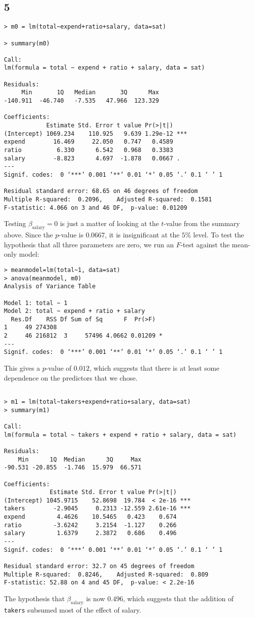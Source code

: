 \documentclass{article}
\begin{document}
\subsection*{5}
\begin{verbatim}
> m0 = lm(total~expend+ratio+salary, data=sat)

> summary(m0)

Call:
lm(formula = total ~ expend + ratio + salary, data = sat)

Residuals:
     Min       1Q   Median       3Q      Max 
-140.911  -46.740   -7.535   47.966  123.329 

Coefficients:
            Estimate Std. Error t value Pr(>|t|)    
(Intercept) 1069.234    110.925   9.639 1.29e-12 ***
expend        16.469     22.050   0.747   0.4589    
ratio          6.330      6.542   0.968   0.3383    
salary        -8.823      4.697  -1.878   0.0667 .  
---
Signif. codes:  0 ‘***’ 0.001 ‘**’ 0.01 ‘*’ 0.05 ‘.’ 0.1 ‘ ’ 1

Residual standard error: 68.65 on 46 degrees of freedom
Multiple R-squared:  0.2096,	Adjusted R-squared:  0.1581 
F-statistic: 4.066 on 3 and 46 DF,  p-value: 0.01209
\end{verbatim}

Testing $\beta_\text{salary}=0$ is just a matter of looking at the $t$-value from the summary above. Since the $p$-value is $0.0667$, it is insignificant at the $5\%$ level. To test the hypothesis that all three parameters are zero, we run an $F$-test against the mean-only model:
\begin{verbatim}
> meanmodel=lm(total~1, data=sat)
> anova(meanmodel, m0)
Analysis of Variance Table

Model 1: total ~ 1
Model 2: total ~ expend + ratio + salary
  Res.Df    RSS Df Sum of Sq      F  Pr(>F)  
1     49 274308                              
2     46 216812  3     57496 4.0662 0.01209 *
---
Signif. codes:  0 ‘***’ 0.001 ‘**’ 0.01 ‘*’ 0.05 ‘.’ 0.1 ‘ ’ 1
\end{verbatim}
This gives a $p$-value of $0.012$, which suggests that there is at least some dependence on the predictors that we chose. 
\begin{verbatim}

> m1 = lm(total~takers+expend+ratio+salary, data=sat)
> summary(m1)

Call:
lm(formula = total ~ takers + expend + ratio + salary, data = sat)

Residuals:
    Min      1Q  Median      3Q     Max 
-90.531 -20.855  -1.746  15.979  66.571 

Coefficients:
             Estimate Std. Error t value Pr(>|t|)    
(Intercept) 1045.9715    52.8698  19.784  < 2e-16 ***
takers        -2.9045     0.2313 -12.559 2.61e-16 ***
expend         4.4626    10.5465   0.423    0.674    
ratio         -3.6242     3.2154  -1.127    0.266    
salary         1.6379     2.3872   0.686    0.496    
---
Signif. codes:  0 ‘***’ 0.001 ‘**’ 0.01 ‘*’ 0.05 ‘.’ 0.1 ‘ ’ 1

Residual standard error: 32.7 on 45 degrees of freedom
Multiple R-squared:  0.8246,	Adjusted R-squared:  0.809 
F-statistic: 52.88 on 4 and 45 DF,  p-value: < 2.2e-16
\end{verbatim}

The hypothesis that $\beta_\text{salary}$ is now $0.496$, which suggests that the addition of \verb|takers| subsumed most of the effect of salary. 
\end{document}

